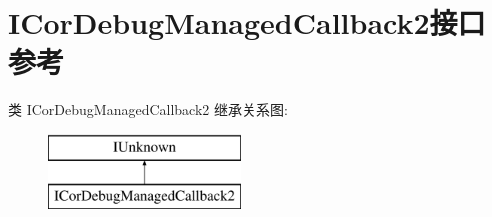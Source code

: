 \hypertarget{interface_i_cor_debug_managed_callback2}{}\section{I\+Cor\+Debug\+Managed\+Callback2接口 参考}
\label{interface_i_cor_debug_managed_callback2}
类 I\+Cor\+Debug\+Managed\+Callback2 继承关系图\+:\begin{figure}[H]
\begin{center}
\leavevmode
\includegraphics[height=2.000000cm]{interface_i_cor_debug_managed_callback2}
\end{center}
\end{figure}
